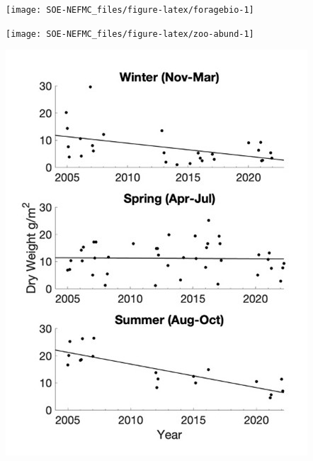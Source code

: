 \documentclass[
  10pt,
]{article}
\let\origfigure\figure
\let\endorigfigure\endfigure
\renewenvironment{figure}[1][2] {
    \expandafter\origfigure\expandafter[H]
} {
    \endorigfigure
}
\begin{document}
\begin{figure}

{\centering \texttt{[image: SOE-NEFMC\_files/figure-latex/foragebio-1]} 

}

\caption{Forage fish index in GB (left) and GOM (right) for spring (blue) and fall (red) surveys. Index values are relative to the maximum observation within a region across surveys.}\label{fig:foragebio}
\end{figure}
\begin{figure}

{\centering \texttt{[image: SOE-NEFMC\_files/figure-latex/zoo-abund-1]} 

}

\caption{Georges Bank (GB) and Gulf of Maine (GOM) abundance anomalies three dominante zooplankton (\textit{Calanus finmarchicus}, \textit{Calanus typicus}, and \textit{Pseudocalanus spp}.).}\label{fig:zoo-abund}
\end{figure}
\begin{figure}

{\centering \includegraphics{SOE-NEFMC_files/figure-latex/zooplankton-season-1} 

}

\caption{Dry mass of mesozooplankton captured with a 200µm ring net towed from the bottom to surface at a deep time series station  in Wilkinson Basin between 2005-2022 (Runge et al. 2023).}\label{fig:zooplankton-season}
\end{figure}
\end{document}
